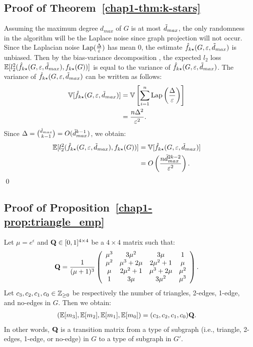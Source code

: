 {\subsection{Proof of Theorem~\ref{chap1-thm:k-stars}}
Assuming the maximum degree $d_{max}$ of $G$ is at most $\tilde{d}_{max}$, the only
randomness in the algorithm will be the Laplace noise since graph projection
will not occur.
Since the Laplacian noise $\textrm{Lap}(\frac{\Delta}{\varepsilon})$ has mean $0$, the estimate $\hat{f}_{k\star}(G, \varepsilon, \tilde{d}_{max})$ is unbiased. 
Then by the bias-variance decomposition \cite{mlpp}, 
the expected $l_2$ loss 
$\mathbb{E}[l_2^2(\hat{f}_{k\star}(G, \varepsilon, \tilde{d}_{max}),\allowbreak f_{k\star}(G))]$ is equal to the variance of $\hat{f}_{k\star}(G, \varepsilon, \tilde{d}_{max})$. 
The variance of $\hat{f}_{k\star}(G, \varepsilon, \tilde{d}_{max})$ can be written as follows:
\begin{align*}
    \mathbb{V}[\hat{f}_{k\star}(G, \varepsilon, \tilde{d}_{max})] 
    &= \mathbb{V}\left[ \sum_{i=1}^n \textrm{Lap}\left( \frac{\Delta}{\varepsilon} \right) \right] \\
    &= \frac{n \Delta^2}{\varepsilon^2}.
\end{align*}
Since $\Delta = \binom{\tilde{d}_{max}}{k-1} = O(\tilde{d}_{max}^{k-1})$, we obtain:
\begin{align*}
    \mathbb{E}[l_2^2(\hat{f}_{k\star}(G, \varepsilon, \tilde{d}_{max}), f_{k\star}(G))] 
    &= \mathbb{V}[\hat{f}_{k\star}(G, \varepsilon, \tilde{d}_{max})] \\
    &= O\left(\frac{n \tilde{d}_{max}^{2k-2}}{\varepsilon^2}\right).
\end{align*}
\qed

\subsection{Proof of Proposition~\ref{chap1-prop:triangle_emp}}
Let $\mu = e^\epsilon$ and $\mathbf{Q} \in [0,1]^{4 \times 4}$ be a $4 \times 4$ matrix such that:
\begin{align}
  \mathbf{Q} = \frac{1}{(\mu+1)^3} \left(
    \begin{array}{cccc}
      \mu^3 & 3\mu^2 & 3\mu & 1 \\
      \mu^2 & \mu^3+2\mu & 2\mu^2+1 & \mu \\
      \mu & 2\mu^2+1 & \mu^3+2\mu & \mu^2 \\
      1 & 3\mu & 3\mu^2 & \mu^3
    \end{array}
  \right).
  \label{chap1-eq:Q_1}
\end{align}
Let $c_3, c_2, c_1, c_0 \in \mathbb{Z}_{\ge0}$ be respectively the number of triangles, 2-edges, 1-edge, and no-edges in $G$. 
Then we obtain:
\begin{align}
(\mathbb{E}[m_3], \mathbb{E}[m_2], \mathbb{E}[m_1],
\mathbb{E}[m_0]) = (c_3, c_2, c_1, c_0) \mathbf{Q}.
\label{chap1-eq:bmQ}
\end{align}
In other words, $\mathbf{Q}$ is a transition matrix from a type of subgraph (i.e., triangle, 2-edges, 1-edge, or no-edge) in $G$ to a type of subgraph in $G'$. 

}
